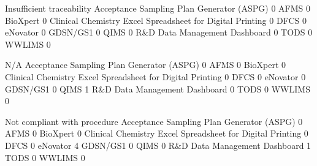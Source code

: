 \documentclass{article}
\begin{document}
\begin{Schunk}
\begin{Soutput}
                                                            Insufficient traceability
  Acceptance Sampling Plan Generator (ASPG)                                         0
  AFMS                                                                              0
  BioXpert                                                                          0
  Clinical Chemistry Excel Spreadsheet for Digital Printing                         0
  DFCS                                                                              0
  eNovator                                                                          0
  GDSN/GS1                                                                          0
  QIMS                                                                              0
  R&D Data Management Dashboard                                                     0
  TODS                                                                              0
  WWLIMS                                                                            0
                                                           
                                                            N/A
  Acceptance Sampling Plan Generator (ASPG)                   0
  AFMS                                                        0
  BioXpert                                                    0
  Clinical Chemistry Excel Spreadsheet for Digital Printing   0
  DFCS                                                        0
  eNovator                                                    0
  GDSN/GS1                                                    0
  QIMS                                                        1
  R&D Data Management Dashboard                               0
  TODS                                                        0
  WWLIMS                                                      0
                                                           
                                                            Not compliant with procedure
  Acceptance Sampling Plan Generator (ASPG)                                            0
  AFMS                                                                                 0
  BioXpert                                                                             0
  Clinical Chemistry Excel Spreadsheet for Digital Printing                            0
  DFCS                                                                                 0
  eNovator                                                                             4
  GDSN/GS1                                                                             0
  QIMS                                                                                 0
  R&D Data Management Dashboard                                                        1
  TODS                                                                                 0
  WWLIMS                                                                               0
                                                           

\end{Soutput}
\end{Schunk}
\end{document}
